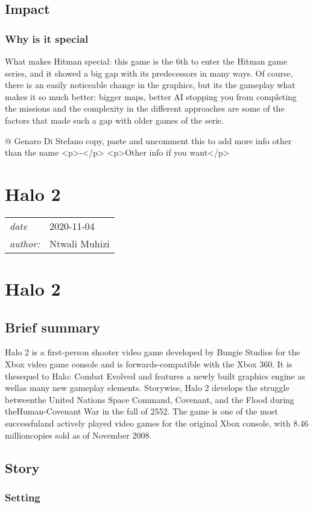 \documentclass[a4paper,10pt]{book}
\newcommand{\pageHeader}[4]{
    \section{#1}
    \vspace{-0.3cm}
    \begin{table}[h!]
     \begin{tabular}{ll}
        \hline
        \textit{date} & #2 \\
        \textit{author: } & #3\\
        \hline
     \end{tabular}
    \end{table}
    \vspace{-0.3cm}
}
\begin{document}
 \subsection{Impact }
 \subsubsection{Why is it special }
 
        What makes Hitman special: this game is the 6th to enter the Hitman game series, and it showed a big gap with its predecessors in many ways. Of course, there is an easily noticeable change in the graphics, but its the gameplay what makes it so much better: bigger maps, better AI stopping you from completing the missions and the complexity in the different approaches are some of the factors that made such a gap with older games of the serie.
       
 
 @ Genaro Di Stefano 
  copy, paste and uncomment this to add more info other than the name
          <p>-</p>
          <p>Other info if you want</p>
         
 
 \newpage\pageHeader{Halo 2}{2020-11-04}{Ntwali Muhizi}{Third iteration of the halo franchise.. yes third}
 \section{ Halo 2 }
 \subsection{Brief summary }
 
          Halo 2 is a first-person shooter video game developed by Bungie Studios for the Xbox video game console and is forwards-compatible with the Xbox 360. 
          It is thesequel to Halo:  Combat Evolved and features a newly built graphics engine as wellas many new gameplay elements. 
          Storywise, Halo 2 develops the struggle betweenthe United Nations Space Command, Covenant, and the Flood during theHuman-Covenant War in the fall of 2552. 
          The game is one of the most successfuland actively played video games for the original Xbox console, with 8.46 millioncopies sold as of November 2008.
         
 
 \subsection{Story }
 
 \subsubsection{Setting }
 
\end{document}
